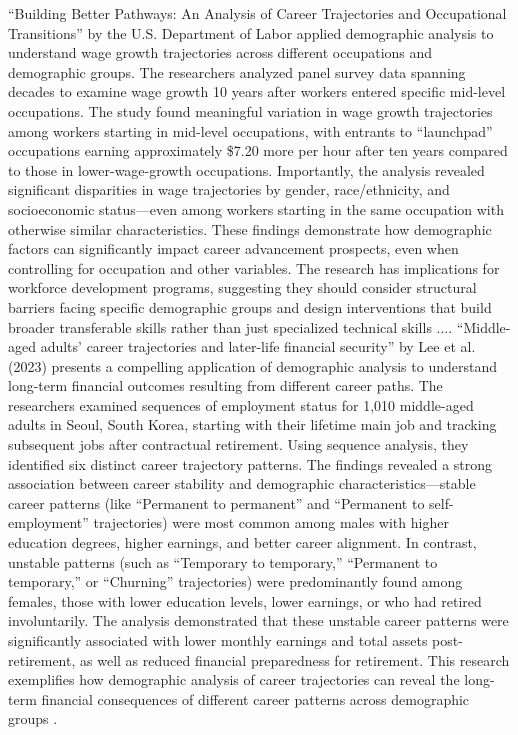 \documentclass[../main.tex]{subfiles}
\begin{document}
``Building Better Pathways: An Analysis of Career Trajectories and Occupational Transitions'' by the U.S. Department of Labor applied demographic analysis to understand wage growth trajectories across different occupations and demographic groups. The researchers analyzed panel survey data spanning decades to examine wage growth 10 years after workers entered specific mid-level occupations. The study found meaningful variation in wage growth trajectories among workers starting in mid-level occupations, with entrants to ``launchpad'' occupations earning approximately \$7.20 more per hour after ten years compared to those in lower-wage-growth occupations. Importantly, the analysis revealed significant disparities in wage trajectories by gender, race/ethnicity, and socioeconomic status—even among workers starting in the same occupation with otherwise similar characteristics. These findings demonstrate how demographic factors can significantly impact career advancement prospects, even when controlling for occupation and other variables. The research has implications for workforce development programs, suggesting they should consider structural barriers facing specific demographic groups and design interventions that build broader transferable skills rather than just specialized technical skills \citep{dol2023building}.... ``Middle-aged adults' career trajectories and later-life financial security'' by Lee et al. (2023) presents a compelling application of demographic analysis to understand long-term financial outcomes resulting from different career paths. The researchers examined sequences of employment status for 1,010 middle-aged adults in Seoul, South Korea, starting with their lifetime main job and tracking subsequent jobs after contractual retirement. Using sequence analysis, they identified six distinct career trajectory patterns. The findings revealed a strong association between career stability and demographic characteristics—stable career patterns (like ``Permanent to permanent'' and ``Permanent to self-employment'' trajectories) were most common among males with higher education degrees, higher earnings, and better career alignment. In contrast, unstable patterns (such as ``Temporary to temporary,'' ``Permanent to temporary,'' or ``Churning'' trajectories) were predominantly found among females, those with lower education levels, lower earnings, or who had retired involuntarily. The analysis demonstrated that these unstable career patterns were significantly associated with lower monthly earnings and total assets post-retirement, as well as reduced financial preparedness for retirement. This research exemplifies how demographic analysis of career trajectories can reveal the long-term financial consequences of different career patterns across demographic groups \citep{lee2023middle}.
\end{document}
